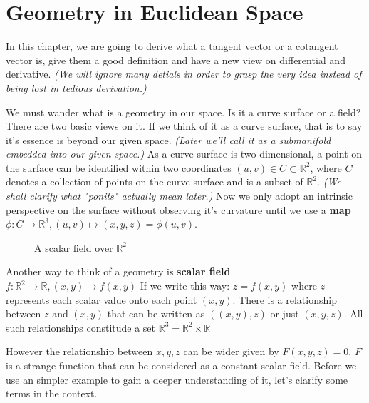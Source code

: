 \chapter{Geometry in Euclidean Space}

In this chapter, we are going to derive what a tangent vector or a cotangent vector is,
give them a good definition and have a new view on differential and derivative. \textit{(We will
ignore many detials in order to grasp the very idea instead of being lost in tedious derivation.)}


We must wander what is a geometry in our space. Is it a curve surface or a field? There are
two basic views on it. If we think of it as a curve surface, that is to say it's essence is beyond
our given space. \textit{(Later we'll call it as a submanifold embedded into our given space.)}
As a curve surface is two-dimensional, a point on the surface can be identified within two coordinates
$(u, v) \in C \subset \mathbb{R}^2$, where $C$ denotes a collection of points on the curve surface
and is a subset of $\mathbb{R}^2$. \textit{(We shall clarify what "ponits" actually mean later.)}
Now we only adopt an intrinsic perspective on the surface without observing it's curvature until we
use a \textbf{map} $\phi: C \to \mathbb{R}^3, (u,v) \mapsto (x,y,z)=\phi(u,v)$.

\begin{figure}[!ht]
    \centering
    
\end{figure}


\begin{figure}[!ht]
	\centering
    
    \caption{A scalar field over $\mathbb{R}^2$}
\end{figure}


Another way to think of a geometry is \textbf{scalar field} $f: \mathbb{R}^2 \to \mathbb{R}, (x,y) \mapsto f(x,y)$
If we write this way: $z=f(x,y)$ where $z$ represents each scalar value onto each point $(x,y)$.
There is a relationship between $z$ and $(x,y)$ that can be written as $((x,y),z)$ or just $(x,y,z)$.
All such relationships constitude a set $\mathbb{R}^3=\mathbb{R}^2 \times \mathbb{R}$

However the relationship between $x,y,z$ can be wider given by $F(x,y,z)=0$. $F$ is a strange function that
can be considered as a constant scalar field. Before we use an simpler example to gain a deeper understanding of it,
let's clarify some terms in the context.

